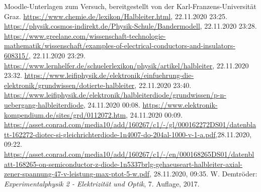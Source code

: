 \documentclass{article}
\begin{document}
\begin{thebibliography}{9}
 Moodle-Unterlagen zum Versuch, bereitgestellt von der Karl-Franzens-Universität Graz.
 \url{https://www.chemie.de/lexikon/Halbleiter.html}, 22.11.2020 23:25.
 \url{https://physik.cosmos-indirekt.de/Physik-Schule/Bandermodell}, 22.11.2020 23:28.
 \url{https://www.greelane.com/wissenschaft-technologie-mathematik/wissenschaft/examples-of-electrical-conductors-and-insulators-608315/}, 22.11.2020 23:29.
 \url{https://www.lernhelfer.de/schuelerlexikon/physik/artikel/halbleiter}, 22.11.2020 23:32.
 \url{https://www.leifiphysik.de/elektronik/einfuehrung-die-elektronik/grundwissen/dotierte-halbleiter}, 22.11.2020 23:40.
 \url{https://www.leifiphysik.de/elektronik/halbleiterdiode/grundwissen/p-n-uebergang-halbleiterdiode}, 24.11.2020 00:08.
 \url{https://www.elektronik-kompendium.de/sites/grd/0112072.htm}, 24.11.2020 00:09.
 \url{https://asset.conrad.com/media10/add/160267/c1/-/gl/000162272DS01/datenblatt-162272-diotec-si-gleichrichterdiode-1n4007-do-204al-1000-v-1-a.pdf},28.11.2020, 09:22.
 \url{https://asset.conrad.com/media10/add/160267/c1/-/en/000168265DS01/datenblatt-168265-on-semiconductor-z-diode-1n5337brlg-gehaeuseart-halbleiter-axial-zener-spannung-47-v-leistung-max-ptot-5-w.pdf}, 28.11.2020, 09:35.
 W. Demtröder: \emph{Experimentalphysik 2 - Elektrizität  und Optik}, 7. Auflage, 2017.
\end{thebibliography}






\lstset{
extendedchars=\true,
inputencoding=utf8
}

%

%


%
\end{document}
